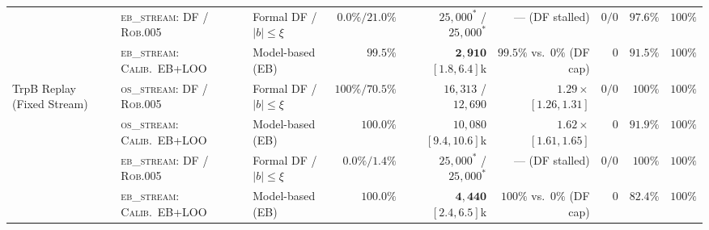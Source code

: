 \documentclass{article}
\theoremstyle{plain}
\theoremstyle{definition}
\begin{document}
\begin{table}[!htbp]
{\begin{tabular}{@{}lllrrrrrr@{}}
 & \textsc{eb\_stream}: DF / \textsc{Rob.005} & Formal DF / $|b|\le\xi$ & $0.0\% / 21.0\%$ & $25{,}000^*$ / $25{,}000^*$ & --- (DF stalled) & $0/0$ & $97.6\%$ & $100\%$ \\
 & \textsc{eb\_stream}: \textsc{Calib.\ EB+LOO} & Model-based (EB) & $99.5\%$ & $\mathbf{2{,}910}$ $[1.8,6.4]$k & $99.5\%$ vs.\ $0\%$ (DF cap) & $0$ & $91.5\%$ & $100\%$ \\
\midrule
\multirow{4}{*}{TrpB Replay (Fixed Stream)}
 & \textsc{os\_stream}: DF / \textsc{Rob.005} & Formal DF / $|b|\le\xi$ & $100\% / 70.5\%$ & $16{,}313$ / $12{,}690$ & $1.29\times$ $[1.26,1.31]$ & $0/0$ & $100\%$ & $100\%$ \\
 & \textsc{os\_stream}: \textsc{Calib.\ EB+LOO} & Model-based (EB) & $100.0\%$ & $10{,}080$ $[9.4,10.6]$k & $1.62\times$ $[1.61,1.65]$ & $0$ & $91.9\%$ & $100\%$ \\
 & \textsc{eb\_stream}: DF / \textsc{Rob.005} & Formal DF / $|b|\le\xi$ & $0.0\% / 1.4\%$ & $25{,}000^*$ / $25{,}000^*$ & --- (DF stalled) & $0/0$ & $100\%$ & $100\%$ \\
 & \textsc{eb\_stream}: \textsc{Calib.\ EB+LOO} & Model-based (EB) & $100.0\%$ & $\mathbf{4{,}440}$ $[2.4,6.5]$k & $100\%$ vs.\ $0\%$ (DF cap) & $0$ & $82.4\%$ & $100\%$ \\
\bottomrule
\end{tabular}%
}
\end{table}
\end{document}
